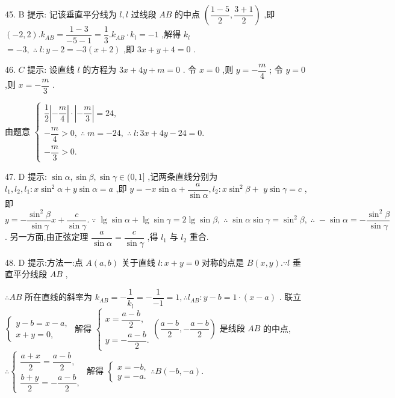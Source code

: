 45. B 提示: 记该垂直平分线为 $l,l$ 过线段 ${AB}$ 的中点 $\left( {\dfrac{1 - 5}{2},\dfrac{3 + 1}{2}}\right)$ ,即 $\left( {-2,2}\right) .{k}_{AB} = \dfrac{1 - 3}{-5 - 1} = \dfrac{1}{3}.{k}_{AB} \cdot  {k}_{l} =  - 1$ ,解得 ${k}_{l}$  $=  - 3,\;\therefore \;l : y - 2 =  - 3\left( {x + 2}\right)$ ,即 ${3x} + y + 4 = 0$ .

46. $C$ 提示: 设直线 $l$ 的方程为 ${3x} + {4y} + m = 0$ . 令 $x = 0$ ,则 $y =  - \dfrac{m}{4}$ ; 令 $y = 0$ ,则 $x =  - \dfrac{m}{3}$ .

由题意 $\left\{  \begin{array}{l} \dfrac{1}{2}\left| {-\dfrac{m}{4}}\right|  \cdot  \left| {-\dfrac{m}{3}}\right|  = {24}, \\   - \dfrac{m}{4} > 0,\;\therefore \;m =  - {24},\;\therefore \;l : {3x} + {4y} - {24} = 0. \\   - \dfrac{m}{3} > 0. \end{array}\right.$

47. D 提示: $\sin \alpha ,\sin \beta ,\sin \gamma  \in  (0,1\rbrack$ ,记两条直线分别为 ${l}_{1},{l}_{2},{l}_{1} : x{\sin }^{2}\alpha  + y\sin \alpha  = a$ ,即 $y =  - x\sin \alpha  + \dfrac{a}{\sin \alpha },{l}_{2} : x{\sin }^{2}\beta  +$  $y\sin \gamma  = c$ ,即 $y =  - \dfrac{{\sin }^{2}\beta }{\sin \gamma }x + \dfrac{c}{\sin \gamma }.\;\because \;\lg \sin \alpha  + \lg \sin \gamma  = 2\lg \sin \beta ,\;\therefore \;\sin \alpha \sin \gamma  = {\sin }^{2}\beta ,\;\therefore \; - \sin \alpha  =  - \dfrac{{\sin }^{2}\beta }{\sin \gamma }$ . 另一方面,由正弦定理 $\dfrac{a}{\sin \alpha } = \dfrac{c}{\sin \gamma }$ ,得 ${l}_{1}$ 与 ${l}_{2}$ 重合.

48. D 提示:方法一:点 $A\left( {a,b}\right)$ 关于直线 $l : x + y = 0$ 对称的点是 $B\left( {x,y}\right) .\because l$ 垂直平分线段 ${AB}$ ,

$\therefore {AB}$ 所在直线的斜率为 ${k}_{AB} =  - \dfrac{1}{{k}_{l}} =  - \dfrac{1}{-1} = 1,\therefore {l}_{AB} : y - b = 1 \cdot  \left( {x - a}\right)$ . 联立 $\left\{  \begin{array}{l} y - b = x - a, \\  x + y = 0, \end{array}\right.$ 解得 $\left\{  {\begin{array}{l} x = \dfrac{a - b}{2}, \\  y =  - \dfrac{a - b}{2}. \end{array}\left( {\dfrac{a - b}{2}, - \dfrac{a - b}{2}}\right) \text{ 是线段 }{AB}}\right.$ 的中点, $\therefore \left\{  {\begin{array}{l} \dfrac{a + x}{2} = \dfrac{a - b}{2}, \\  \dfrac{b + y}{2} =  - \dfrac{a - b}{2}, \end{array}\text{ 解得 }\left\{  {\begin{array}{l} x =  - b, \\  y =  - a. \end{array}\therefore B\left( {-b, - a}\right) .}\right. }\right.$

